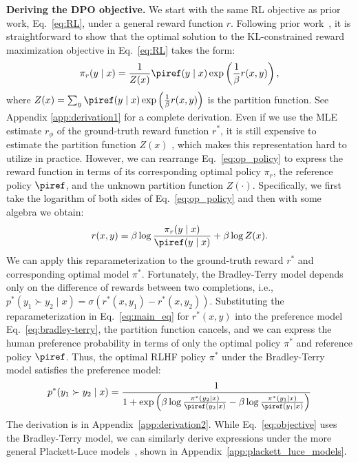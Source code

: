 \textbf{Deriving the DPO objective.} We start with the same RL objective as prior work, Eq.~\ref{eq:RL}, under a general reward function $r$. Following prior work~\citep{peters2007reinforcement, peng2019advantage, korbak2022reinforcement, go2023aligning}, it is straightforward to show that the optimal solution to the KL-constrained reward maximization objective in Eq.~\ref{eq:RL} takes the form:
\begin{equation}\label{eq:op_policy}
    \pi_r(y\mid x) = \frac{1}{Z(x)}\piref(y\mid x)\exp\left(\frac{1}{\beta}r(x, y)\right),
\end{equation}%
where $Z(x) =\sum_{y}\piref(y\mid x)\exp\left(\frac{1}{\beta}r(x, y)\right)$ is the partition function. See Appendix \ref{app:derivation1} for a complete derivation. Even if we use the MLE estimate $r_{\phi}$ of the ground-truth reward function $r^*$, it is still expensive to estimate the partition function $Z(x)$ \citep{korbak2022reinforcement, go2023aligning}, which makes this representation hard to utilize in practice. However, we can rearrange Eq.~\ref{eq:op_policy} to express the reward function in terms of its corresponding optimal policy $\pi_r$, the reference policy $\piref$, and the unknown partition function $Z(\cdot)$. Specifically, we first take the logarithm of both sides of Eq.~\ref{eq:op_policy} and then with some algebra we obtain:
\begin{equation}\label{eq:main_eq}
    r(x,y) =\beta \log \frac{\pi_r(y\mid x)}{\piref(y\mid x)} + \beta \log Z(x).
\end{equation}
We can apply this reparameterization to the ground-truth reward $r^*$ and corresponding optimal model $\pi^*$. Fortunately, the Bradley-Terry model depends only on the difference of rewards between two completions, i.e., ${p^*(y_1 \succ y_2 \mid x) = \sigma(r^*(x, y_1) - r^*(x, y_2))}$. Substituting the reparameterization in Eq.~\ref{eq:main_eq} for $r^*(x,y)$ into the preference model Eq.~\ref{eq:bradley-terry}, the partition function cancels, and we can express the human preference probability in terms of only the optimal policy $\pi^*$ and reference policy $\piref$. Thus, the optimal RLHF policy $\pi^*$ under the Bradley-Terry model satisfies the preference model:
\begin{equation}\label{eq:objective}
    p^*(y_1\succ y_2 \mid x)=\frac{1}{1 + \exp\left(\beta \log \frac{\pi^*(y_2\mid x)}{\piref(y_2\mid x)} - \beta \log \frac{\pi^*(y_1\mid x)}{\piref(y_1\mid x)}\right)}
\end{equation}
The derivation is in Appendix~\ref{app:derivation2}. While Eq.~\ref{eq:objective} uses the Bradley-Terry model, we can similarly derive expressions under the more general Plackett-Luce models~\citep{plackett1975analysis, luce2012individual}, shown in Appendix~\ref{app:plackett_luce_models}.

